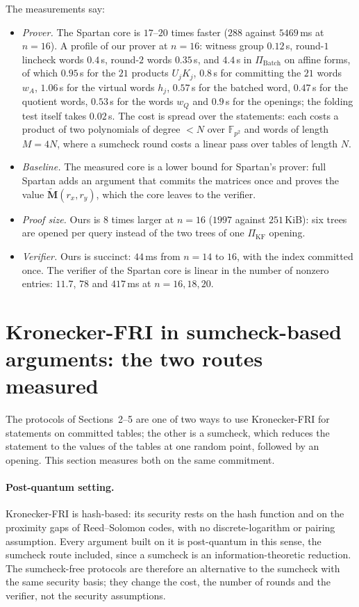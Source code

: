 \documentclass[11pt]{article}
\theoremstyle{definition}
\newcommand{\F}{\mathbb{F}}
\begin{document}
The measurements say:
\begin{itemize}[nosep]
\item \emph{Prover.} The Spartan core is $17$--$20$ times faster ($288$ against $5469$\,ms at $n=16$). A profile of our prover at $n=16$: witness group $0.12$\,s, round-$1$ lincheck words $0.4$\,s, round-$2$ words $0.35$\,s, and $4.4$\,s in $\Pi_{\mathrm{Batch}}$ on affine forms, of which $0.95$\,s for the $21$ products $U_jK_j$, $0.8$\,s for committing the $21$ words $w_A$, $1.06$\,s for the virtual words $h_j$, $0.57$\,s for the batched word, $0.47$\,s for the quotient words, $0.53$\,s for the words $w_Q$ and $0.9$\,s for the openings; the folding test itself takes $0.02$\,s. The cost is spread over the statements: each costs a product of two polynomials of degree $<N$ over $\F_{p^2}$ and words of length $M=4N$, where a sumcheck round costs a linear pass over tables of length $N$.
\item \emph{Baseline.} The measured core is a lower bound for Spartan's prover: full Spartan adds an argument that commits the matrices once and proves the value $\tilde{\mathbf M}(r_x,r_y)$, which the core leaves to the verifier.
\item \emph{Proof size.} Ours is $8$ times larger at $n=16$ ($1997$ against $251$\,KiB): six trees are opened per query instead of the two trees of one $\Pi_{\mathrm{KF}}$ opening.
\item \emph{Verifier.} Ours is succinct: $44$\,ms from $n=14$ to $16$, with the index committed once. The verifier of the Spartan core is linear in the number of nonzero entries: $11.7$, $78$ and $417$\,ms at $n=16,18,20$.
\end{itemize}


\section{Kronecker-FRI in sumcheck-based arguments: the two routes measured}\label{sec:routes}

The protocols of Sections~2--5 are one of two ways to use Kronecker-FRI for statements on committed tables; the other is a sumcheck, which reduces the statement to the values of the tables at one random point, followed by an opening. This section measures both on the same commitment.

\paragraph{Post-quantum setting.} Kronecker-FRI is hash-based: its security rests on the hash function and on the proximity gaps of Reed--Solomon codes, with no discrete-logarithm or pairing assumption. Every argument built on it is post-quantum in this sense, the sumcheck route included, since a sumcheck is an information-theoretic reduction. The sumcheck-free protocols are therefore an alternative to the sumcheck with the same security basis; they change the cost, the number of rounds and the verifier, not the security assumptions.
\end{document}
